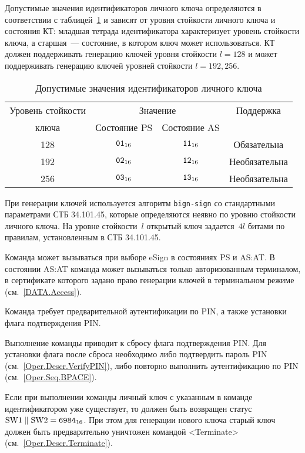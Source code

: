 Допустимые значения идентификаторов личного ключа определяются
в соответствии с таблицей~\ref{Table.Oper.KeyRef} и зависят от
уровня стойкости личного ключа и состояния КТ:
младшая тетрада идентификатора характеризует уровень стойкости ключа,
а старшая~--- состояние, в котором ключ может использоваться.
%
КТ должен поддерживать генерацию ключей уровня стойкости 
$l=128$ и может поддерживать генерацию ключей 
уровней стойкости $l=192,256$.

\begin{table}[hbt]
\caption{Допустимые значения идентификаторов личного ключа}
\label{Table.Oper.KeyRef}
\begin{tabular}{|c|c|c|c|}
\hline
Уровень стойкости & \multicolumn{2}{|c|}{Значение } & Поддержка\\
\cline{2-3}
ключа & Состояние PS & Состояние AS & \\
\hline
\hline
128 & $\texttt{01}_{16}$ & $\texttt{11}_{16}$ & Обязательна \\
192 & $\texttt{02}_{16}$ & $\texttt{12}_{16}$ & Необязательна\\
256 & $\texttt{03}_{16}$ & $\texttt{13}_{16}$ & Необязательна\\
\hline
\end{tabular}
\end{table}

При генерации ключей используется алгоритм \texttt{bign-sign}
со стандартными параметрами СТБ 34.101.45, 
которые определяются неявно по уровню стойкости личного ключа. 
%
На уровне стойкости~$l$ открытый ключ задается~$4l$ битами
по правилам, установленным в СТБ 34.101.45.

Команда может вызываться при выборе eSign в состояниях 
PS и AS:AT. В состоянии AS:AT команда может вызываться 
только авторизованным терминалом, в сертификате которого задано право
генерации ключей в терминальном режиме (см.~\ref{DATA.Access}).

Команда требует предварительной аутентификации по PIN, 
а также установки флага подтверждения PIN.

Выполнение команды приводит к сбросу флага подтверждения PIN.
Для установки флага после сброса необходимо либо подтвердить пароль PIN 
(см.~\ref{Oper.Descr.VerifyPIN}), либо повторно выполнить аутентификацию по PIN 
(см.~\ref{Oper.Seq.BPACE}). 

Если при выполнении команды личный ключ с указанным в команде идентификатором
уже существует, то должен быть возвращен статус 
$\text{SW1} \parallel \text{SW2} = \texttt{6984}_{16}$. 
При этом для генерации нового ключа старый ключ должен быть предварительно 
уничтожен командой <Terminate> (см.~\ref{Oper.Descr.Terminate}).

